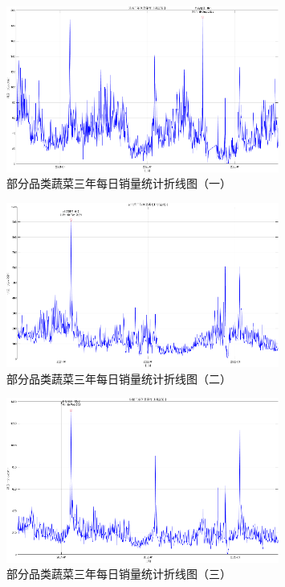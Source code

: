 \documentclass{cumcmthesis}
\begin{document}
\begin{figure}[H]
    \centering
    \includegraphics[width=0.8\textwidth]{其他品类日销量折线图1.png} 
    \caption{部分品类蔬菜三年每日销量统计折线图（一）}
\end{figure}

\begin{figure}[H]
    \centering
    \includegraphics[width=0.8\textwidth]{其他品类日销量折线图2.png} 
    \caption{部分品类蔬菜三年每日销量统计折线图（二）}
\end{figure}

\begin{figure}[H]
    \centering
    \includegraphics[width=0.8\textwidth]{其他品类日销量折线图3.png} 
    \caption{部分品类蔬菜三年每日销量统计折线图（三）}
\end{figure}
\end{document}
